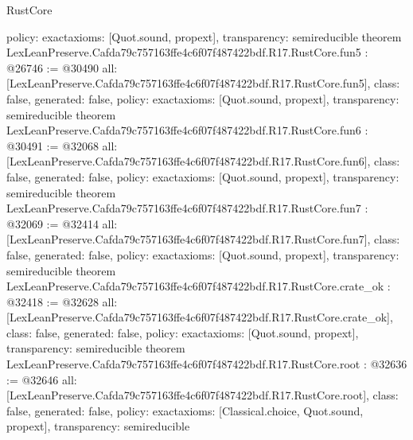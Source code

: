 \begin{lexlean}{RustCore}
\begin{coremodule}
{  policy: exact{axioms: [Quot.sound, propext]},
  transparency: semireducible
}
theorem LexLeanPreserve.Cafda79c757163ffe4c6f07f487422bdf.R17.RustCore.fun5 : @26746 := @30490 {
  all: [LexLeanPreserve.Cafda79c757163ffe4c6f07f487422bdf.R17.RustCore.fun5],
  class: false,
  generated: false,
  policy: exact{axioms: [Quot.sound, propext]},
  transparency: semireducible
}
theorem LexLeanPreserve.Cafda79c757163ffe4c6f07f487422bdf.R17.RustCore.fun6 : @30491 := @32068 {
  all: [LexLeanPreserve.Cafda79c757163ffe4c6f07f487422bdf.R17.RustCore.fun6],
  class: false,
  generated: false,
  policy: exact{axioms: [Quot.sound, propext]},
  transparency: semireducible
}
theorem LexLeanPreserve.Cafda79c757163ffe4c6f07f487422bdf.R17.RustCore.fun7 : @32069 := @32414 {
  all: [LexLeanPreserve.Cafda79c757163ffe4c6f07f487422bdf.R17.RustCore.fun7],
  class: false,
  generated: false,
  policy: exact{axioms: [Quot.sound, propext]},
  transparency: semireducible
}
theorem LexLeanPreserve.Cafda79c757163ffe4c6f07f487422bdf.R17.RustCore.crate_ok : @32418 := @32628 {
  all: [LexLeanPreserve.Cafda79c757163ffe4c6f07f487422bdf.R17.RustCore.crate_ok],
  class: false,
  generated: false,
  policy: exact{axioms: [Quot.sound, propext]},
  transparency: semireducible
}
theorem LexLeanPreserve.Cafda79c757163ffe4c6f07f487422bdf.R17.RustCore.root : @32636 := @32646 {
  all: [LexLeanPreserve.Cafda79c757163ffe4c6f07f487422bdf.R17.RustCore.root],
  class: false,
  generated: false,
  policy: exact{axioms: [Classical.choice, Quot.sound, propext]},
  transparency: semireducible
}


\end{coremodule}
\end{lexlean}
